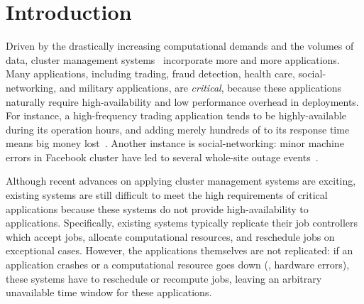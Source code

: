 \section{Introduction} \label{sec:intro}

Driven by the drastically increasing computational demands and the volumes of 
data, cluster 
management systems~\cite{borg:eurosys15,mesos:nsdi11,tupperware,yarn:socc13,
autopilot:sosp07,quincy:sosp09,apollo:osdi14,fuxi:vldb14} 
incorporate more and more applications. Many applications, including trading, 
fraud detection, health care, social-networking, and military applications, are 
\emph{critical}, because these applications naturally require high-availability 
and low performance overhead in deployments. For instance, a high-frequency 
trading application tends to be highly-available during its operation hours, and 
adding merely hundreds of \us to its response time means big money 
lost~\cite{nosql:finance}. Another instance is social-networking: minor machine 
errors in Facebook cluster have led to several whole-site outage 
events~\cite{facebook:outage}.



Although recent advances on applying cluster management systems are exciting, 
existing systems are still difficult to meet the high requirements of 
critical applications because these systems do not provide high-availability to 
applications. Specifically, existing systems typically replicate their job 
controllers which accept jobs, allocate computational resources, and reschedule 
jobs on exceptional cases. However, the applications themselves are not 
replicated: if an application crashes or a computational resource goes down 
(\eg, hardware errors), these systems have to reschedule or recompute jobs, 
leaving an arbitrary unavailable time window for these applications.

